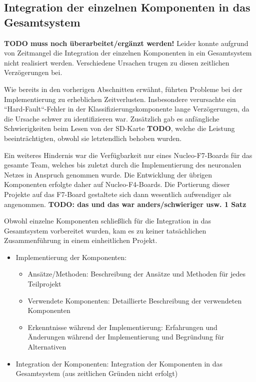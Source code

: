 





\subsection{Integration der einzelnen Komponenten in das Gesamtsystem}
\label{sec:no-gesamtintegration}

\textbf{TODO muss noch überarbeitet/ergänzt werden!}
Leider konnte aufgrund von Zeitmangel die Integration der einzelnen Komponenten in ein Gesamtsystem nicht realisiert werden. Verschiedene Ursachen trugen zu diesen zeitlichen Verzögerungen bei.

Wie bereits in den vorherigen Abschnitten erwähnt, führten Probleme bei der Implementierung zu erheblichen Zeitverlusten. Insbesondere verursachte ein ``Hard-Fault``-Fehler in der Klassifizierungskomponente lange Verzögerungen, da die Ursache schwer zu identifizieren war. Zusätzlich gab es anfängliche Schwierigkeiten beim Lesen von der SD-Karte \textbf{TODO}, welche die Leistung beeinträchtigten, obwohl sie letztendlich behoben wurden.

Ein weiteres Hindernis war die Verfügbarkeit nur eines Nucleo-F7-Boards für das gesamte Team, welches bis zuletzt durch die Implementierung des neuronalen Netzes in Anspruch genommen wurde. Die Entwicklung der übrigen Komponenten erfolgte daher auf Nucleo-F4-Boards. Die Portierung dieser Projekte auf das F7-Board gestaltete sich dann wesentlich aufwendiger als angenommen. \textbf{TODO: das und das war anders/schwieriger usw. 1 Satz}

Obwohl einzelne Komponenten schließlich für die Integration in das Gesamtsystem vorbereitet wurden, kam es zu keiner tatsächlichen Zusammenführung in einem einheitlichen Projekt.


\begin{itemize}

	\item Implementierung der Komponenten:
	\begin{itemize}
		\item Ansätze/Methoden: Beschreibung der Ansätze und Methoden für jedes Teilprojekt
		\item Verwendete Komponenten: Detaillierte Beschreibung der verwendeten Komponenten
		\item Erkenntnisse während der Implementierung: Erfahrungen und Änderungen während der Implementierung und Begründung für Alternativen
	\end{itemize}
	\item Integration der Komponenten: Integration der Komponenten in das Gesamtsystem (aus zeitlichen Gründen nicht erfolgt)
\end{itemize}



